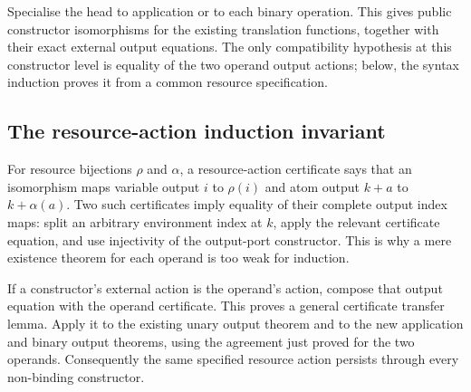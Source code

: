
Specialise the head to application or to each binary operation. This gives
public constructor isomorphisms for the existing translation functions, together
with their exact external output equations. The only compatibility hypothesis
at this constructor level is equality of the two operand output actions; below,
the syntax induction proves it from a common resource specification.


\subsection{The resource-action induction invariant}

For resource bijections $\rho$ and $\alpha$, a resource-action certificate says
that an isomorphism maps variable output $i$ to $\rho(i)$ and atom output $k+a$
to $k+\alpha(a)$. Two such certificates imply equality of their complete output
index maps: split an arbitrary environment index at $k$, apply the relevant
certificate equation, and use injectivity of the output-port constructor.
This is why a mere existence theorem for each operand is too weak for induction.


If a constructor's external action is the operand's action, compose that
output equation with the operand certificate. This proves a general certificate
transfer lemma. Apply it to the existing unary output theorem and to the new
application and binary output theorems, using the agreement just proved for the
two operands. Consequently the same specified resource action persists through
every non-binding constructor.

